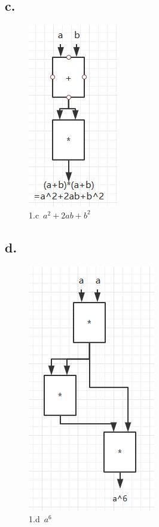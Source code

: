 \documentclass[11pt,a4paper]{article}
\begin{document}
	\subsection*{c.}
	\begin{figure}[H]
		\centering
		\includegraphics[scale=0.7]{1_c.jpg}
		\caption{1.c\ $a^{2}+2ab+b^{2}$}
		\label{1.c}
	\end{figure}\par
	\subsection*{d.}
	\begin{figure}[H]
		\centering
		\includegraphics[scale=0.7]{1_d.jpg}
		\caption{1.d\ $a^{6}$}
		\label{1.d}
	\end{figure}\par
\end{document}
